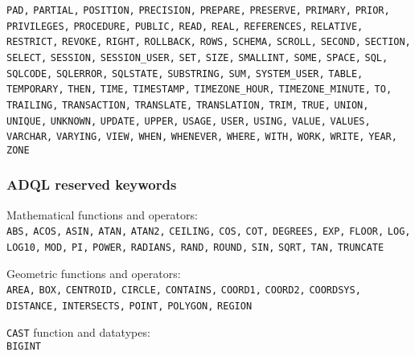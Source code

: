 \documentclass[11pt,a4paper]{ivoa}
\begin{document}
\texttt{PAD,} \texttt{PARTIAL,} \texttt{POSITION,}
\texttt{PRECISION,} \texttt{PREPARE,} \texttt{PRESERVE,}
\texttt{PRIMARY,} \texttt{PRIOR,} \texttt{PRIVILEGES,}
\texttt{PROCEDURE,} \texttt{PUBLIC,} \texttt{READ,} \texttt{REAL,}
\texttt{REFERENCES,} \texttt{RELATIVE,} \texttt{RESTRICT,}
\texttt{REVOKE,} \texttt{RIGHT,} \texttt{ROLLBACK,} \texttt{ROWS,}
\texttt{SCHEMA,} \texttt{SCROLL,} \texttt{SECOND,} \texttt{SECTION,}
\texttt{SELECT,} \texttt{SESSION,} \texttt{SESSION\_USER,}
\texttt{SET,} \texttt{SIZE,} \texttt{SMALLINT,} \texttt{SOME,}
\texttt{SPACE,} \texttt{SQL,} \texttt{SQLCODE,} \texttt{SQLERROR,}
\texttt{SQLSTATE,} \texttt{SUBSTRING,} \texttt{SUM,}
\texttt{SYSTEM\_USER,} \texttt{TABLE,} \texttt{TEMPORARY,}
\texttt{THEN,} \texttt{TIME,} \texttt{TIMESTAMP,}
\texttt{TIMEZONE\_HOUR,} \texttt{TIMEZONE\_MINUTE,} \texttt{TO,}
\texttt{TRAILING,} \texttt{TRANSACTION,} \texttt{TRANSLATE,}
\texttt{TRANSLATION,} \texttt{TRIM,} \texttt{TRUE,} \texttt{UNION,}
\texttt{UNIQUE,} \texttt{UNKNOWN,} \texttt{UPDATE,} \texttt{UPPER,}
\texttt{USAGE,} \texttt{USER,} \texttt{USING,} \texttt{VALUE,}
\texttt{VALUES,} \texttt{VARCHAR,} \texttt{VARYING,} \texttt{VIEW,}
\texttt{WHEN,} \texttt{WHENEVER,} \texttt{WHERE,} \texttt{WITH,}
\texttt{WORK,} \texttt{WRITE,} \texttt{YEAR,} \texttt{ZONE}

\subsubsection{ADQL reserved keywords}
\label{sec:adql.reswords}

\noindent
Mathematical functions and operators:\\
\noindent
\texttt{ABS,} \texttt{ACOS,} \texttt{ASIN,} \texttt{ATAN,}
\texttt{ATAN2,} \texttt{CEILING,} \texttt{COS,} \texttt{COT,}
\texttt{DEGREES,} \texttt{EXP,} \texttt{FLOOR,} \texttt{LOG,}
\texttt{LOG10,} \texttt{MOD,}  \texttt{PI,} \texttt{POWER,}
\texttt{RADIANS,} \texttt{RAND,} \texttt{ROUND,} \texttt{SIN,}
\texttt{SQRT,} \texttt{TAN,} \texttt{TRUNCATE}
\newline

\noindent
Geometric functions and operators:\\
\noindent
\texttt{AREA,} \texttt{BOX,} \texttt{CENTROID,} \texttt{CIRCLE,}
\texttt{CONTAINS,} \texttt{COORD1,} \texttt{COORD2,}
\texttt{COORDSYS,} \texttt{DISTANCE,} \texttt{INTERSECTS,}
\texttt{POINT,} \texttt{POLYGON,} \texttt{REGION}
\newline

\noindent
\verb:CAST: function and datatypes:\\
\noindent
\texttt{BIGINT}
\newline
\end{document}
